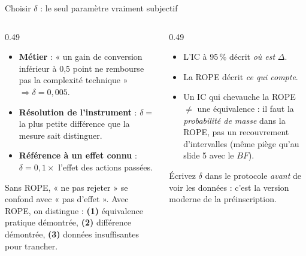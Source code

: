 \begin{frame}{Choisir $\delta$ : le seul paramètre vraiment subjectif}
\small
\begin{columns}[t]
\begin{column}{0.49\textwidth}
\begin{kbox}
\begin{itemize}
  \item \textbf{Métier} : « un gain de conversion inférieur à 0,5 point ne
        rembourse pas la complexité technique » $\Rightarrow \delta = 0{,}005$.
  \item \textbf{Résolution de l'instrument} : $\delta = $ la plus petite
        différence que la mesure sait distinguer.
  \item \textbf{Référence à un effet connu} : $\delta = 0{,}1 \times$ l'effet
        des actions passées.
\end{itemize}
\end{kbox}
\vspace{1mm}
\begin{ebox}
Sans ROPE, « ne pas rejeter » se confond avec « pas d'effet ».
Avec ROPE, on distingue :
\textbf{(1)} équivalence pratique démontrée, \textbf{(2)} différence
démontrée, \textbf{(3)} données insuffisantes pour trancher.
\end{ebox}
\end{column}
\begin{column}{0.49\textwidth}
\begin{wbox}[ROPE $\ne$ IC à 95\,\%]
\begin{itemize}
  \item L'IC à 95\,\% décrit \emph{où est} $\Delta$.
  \item La ROPE décrit \emph{ce qui compte}.
  \item Un IC qui chevauche la ROPE $\ne$ une équivalence : il faut la
        \emph{probabilité de masse} dans la ROPE, pas un recouvrement
        d'intervalles (même piège qu'au slide 5 avec le $BF$).
\end{itemize}
\end{wbox}
\begin{kbox}
Écrivez $\delta$ dans le protocole \emph{avant} de voir les données :
c'est la version moderne de la préinscription.
\end{kbox}
\end{column}
\end{columns}
\end{frame}

